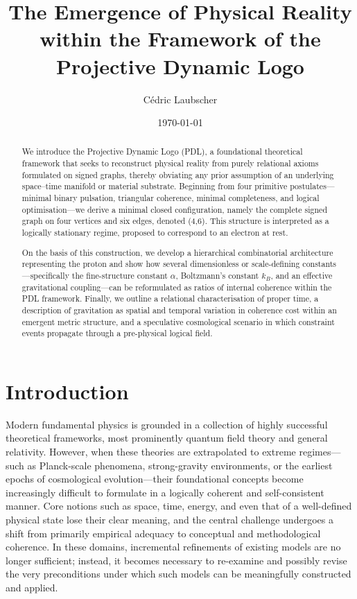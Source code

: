 \documentclass[11pt,a4paper]{article}
\title{The Emergence of Physical Reality within the Framework of the Projective Dynamic Logo}
\author{C\'edric Laubscher}
\affil{Independent researcher in theoretical and mathematical physics, Switzerland\\}
\date{\today}
\begin{document}
\maketitle

\begin{abstract}
We introduce the Projective Dynamic Logo (PDL), a foundational theoretical framework that seeks to reconstruct physical reality from purely relational axioms formulated on signed graphs, thereby obviating any prior assumption of an underlying space–time manifold or material substrate. Beginning from four primitive postulates—minimal binary pulsation, triangular coherence, minimal completeness, and logical optimisation—we derive a minimal closed configuration, namely the complete signed graph on four vertices and six edges, denoted (4,6). This structure is interpreted as a logically stationary regime, proposed to correspond to an electron at rest. 

On the basis of this construction, we develop a hierarchical combinatorial architecture representing the proton and show how several dimensionless or scale-defining constants—specifically the fine-structure constant $\alpha$, Boltzmann’s constant $k_B$, and an effective gravitational coupling—can be reformulated as ratios of internal coherence within the PDL framework. Finally, we outline a relational characterisation of proper time, a description of gravitation as spatial and temporal variation in coherence cost within an emergent metric structure, and a speculative cosmological scenario in which constraint events propagate through a pre-physical logical field.
\end{abstract}

\newpage
\section{Introduction}

Modern fundamental physics is grounded in a collection of highly successful theoretical frameworks, most prominently quantum field theory and general relativity. However, when these theories are extrapolated to extreme regimes—such as Planck-scale phenomena, strong-gravity environments, or the earliest epochs of cosmological evolution—their foundational concepts become increasingly difficult to formulate in a logically coherent and self-consistent manner. Core notions such as space, time, energy, and even that of a well-defined physical state lose their clear meaning, and the central challenge undergoes a shift from primarily empirical adequacy to conceptual and methodological coherence. In these domains, incremental refinements of existing models are no longer sufficient; instead, it becomes necessary to re-examine and possibly revise the very preconditions under which such models can be meaningfully constructed and applied.
\end{document}
